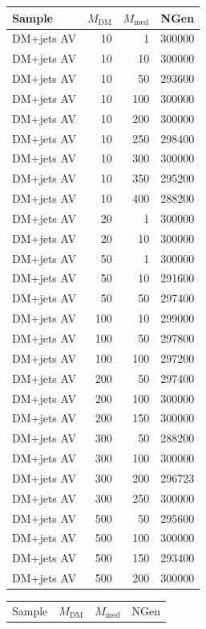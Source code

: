 \begin{table}[]
\centering
\begin{tabular}[t]{lrrr}
\hline \hline
Sample & $M_{\text{DM}}$ & $M_{\text{med}}$ & NGen \\
\hline
DM+jets AV & 10   & 1    &300000 \\
DM+jets AV & 10   & 10   &300000 \\
DM+jets AV & 10   & 50   &293600 \\
DM+jets AV & 10   & 100  &300000 \\
DM+jets AV & 10   & 200  &300000 \\
DM+jets AV & 10   & 250  &298400 \\
DM+jets AV & 10   & 300  &300000 \\
DM+jets AV & 10   & 350  &295200 \\
DM+jets AV & 10   & 400  &288200 \\
DM+jets AV & 20   & 1    &300000 \\
DM+jets AV & 20   & 10   &300000 \\
DM+jets AV & 50   & 1    &300000 \\
DM+jets AV & 50   & 10   &291600 \\
DM+jets AV & 50   & 50   &297400 \\
DM+jets AV & 100  & 10   &299000 \\
DM+jets AV & 100  & 50   &297800 \\
DM+jets AV & 100  & 100  &297200 \\
DM+jets AV & 200  & 50   &297400 \\
DM+jets AV & 200  & 100  &300000 \\
DM+jets AV & 200  & 150  &300000 \\
DM+jets AV & 300  & 50   &288200 \\
DM+jets AV & 300  & 100  &300000 \\
DM+jets AV & 300  & 200  &296723 \\
DM+jets AV & 300  & 250  &300000 \\
DM+jets AV & 500  & 50   &295600 \\
DM+jets AV & 500  & 100  &300000 \\
DM+jets AV & 500  & 150  &293400 \\
DM+jets AV & 500  & 200  &300000 \\
\hline\hline
\end{tabular}
\hspace{2em}
\begin{tabular}[t]{lrrr}
\hline\hline
Sample & $M_{\text{DM}}$ & $M_{\text{med}}$ & NGen \\

\end{tabular}
\end{table}
